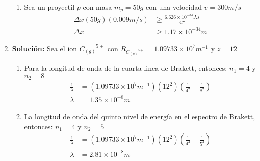 \documentclass{article}
\begin{document}
\begin{enumerate}
\begin{enumerate}
        \item 
        Sea un proyectil $p$ con masa $m_p = 50g$ con una velocidad $v = 300m/s$ 
        \begin{equation*}
            \begin{split}
                \Delta x (50g) (0.009m/s) &\geqslant \frac{6.626 \times 10^{-34}J.s}{4\pi}\\
                \Delta x &\geqslant 1.17 \times 10^{-34}m
        \end{split}
        \end{equation*}
    \end{enumerate}
    
    
    \item 
    \textbf{Solución:}
    Sea el ion ${C_{(g)}}^{5+}$ con $R_{{C_{(g)}}^{5+}} = 1.09733 \times 10^{7}m^{-1}$ y $z = 12$
    \begin{enumerate}
        \item 
        Para la longitud de onda de la cuarta linea de Brakett, entonces: $n_1 = 4$ y $n_2 = 8$
        \begin{equation*}
            \begin{split}
                \frac{1}{\lambda} &= (1.09733 \times 10^{7}m^{-1})(12^{2}) \left(\frac{1}{4^{2}} - \frac{1}{8^{2}} \right)\\
                \lambda &= 1.35 \times 10^{-8}m
            \end{split}
        \end{equation*}

        \item
        La longitud de onda del quinto nivel de energ\'ia en el espectro de Brakett, entonces: $n_1 = 4$ y $n_2 = 5$
        \begin{equation*}
            \begin{split}
                \frac{1}{\lambda} &= (1.09733 \times 10^{7}m^{-1})(12^{2}) \left(\frac{1}{4^{2}} - \frac{1}{5^{2}} \right)\\
                \lambda &= 2.81 \times 10^{-8}m
        \end{split}
        \end{equation*}
    \end{enumerate}



\end{enumerate}
\end{document}
